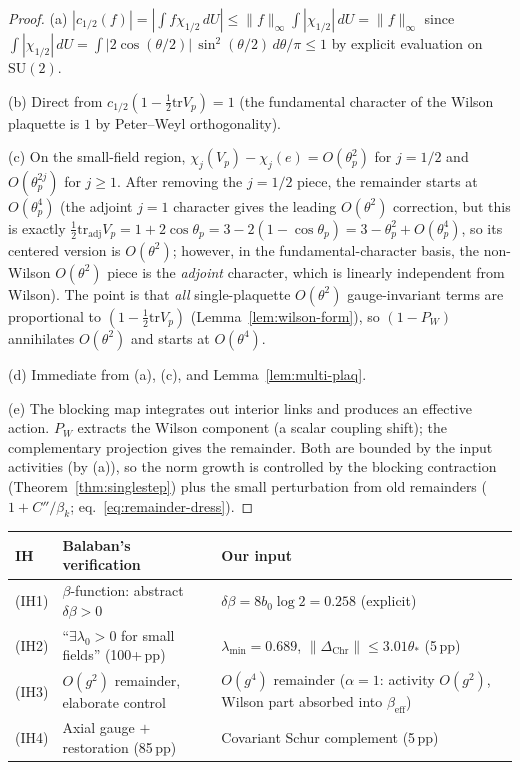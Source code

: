 \documentclass[11pt]{article}
\theoremstyle{definition}
\newcommand{\SU}{\mathrm{SU}}
\newcommand{\tr}{\mathrm{tr}}
\begin{document}
\begin{proof}
(a) $|c_{1/2}(f)|=|\int f\chi_{1/2}\,dU|\le\|f\|_\infty
\int|\chi_{1/2}|\,dU=\|f\|_\infty$ since
$\int|\chi_{1/2}|\,dU=\int|2\cos(\theta/2)|\,\sin^2(\theta/2)
\,d\theta/\pi\le 1$ by explicit evaluation on $\SU(2)$.

(b) Direct from $c_{1/2}(1-\frac{1}{2}\tr V_p)=1$
(the fundamental character of the Wilson plaquette is $1$ by
Peter--Weyl orthogonality).

(c) On the small-field region, $\chi_j(V_p)-\chi_j(e)
=O(\theta_p^2)$ for $j=1/2$ and $O(\theta_p^{2j})$ for $j\ge 1$.
After removing the $j=1/2$ piece, the remainder starts at
$O(\theta_p^4)$ (the adjoint $j=1$ character gives the
leading $O(\theta^2)$ correction, but this is exactly
$\frac{1}{2}\tr_{\mathrm{adj}}V_p=
1+2\cos\theta_p=3-2(1-\cos\theta_p)=3-\theta_p^2+O(\theta_p^4)$,
so its centered version is $O(\theta^2)$; however, in the
fundamental-character basis, the non-Wilson $O(\theta^2)$
piece is the \emph{adjoint} character, which is linearly
independent from Wilson).  The point is that \emph{all}
single-plaquette $O(\theta^2)$ gauge-invariant terms are
proportional to $(1-\frac{1}{2}\tr V_p)$
(Lemma~\ref{lem:wilson-form}), so $(1-P_W)$ annihilates
$O(\theta^2)$ and starts at $O(\theta^4)$.

(d) Immediate from (a), (c), and Lemma~\ref{lem:multi-plaq}.

(e) The blocking map integrates out interior links and produces
an effective action.  $P_W$ extracts the Wilson component (a
scalar coupling shift); the complementary projection gives the
remainder.  Both are bounded by the input activities
(by (a)), so the norm growth is controlled by the blocking
contraction (Theorem~\ref{thm:singlestep}) plus the small
perturbation from old remainders ($1+C''/\beta_k$;
eq.~\eqref{eq:remainder-dress}).
\end{proof}

\begin{center}
\begin{tabular}{lp{5cm}p{5cm}}
\toprule
\textbf{IH} & \textbf{Balaban's verification} & \textbf{Our input}\\
\midrule
(IH1) & $\beta$-function: abstract $\delta\beta>0$ &
$\delta\beta=8b_0\log 2=0.258$ (explicit)\\
(IH2) & ``$\exists\lambda_0>0$ for small fields'' (100+\,pp) &
$\lambda_{\min}=0.689$, $\|\Delta_{\mathrm{Chr}}\|\le 3.01\theta_*$ (5\,pp)\\
(IH3) & $O(g^2)$ remainder, elaborate control &
$O(g^4)$ remainder ($\alpha=1$: activity $O(g^2)$, Wilson part absorbed into $\beta_{\mathrm{eff}}$)\\
(IH4) & Axial gauge $+$ restoration (85\,pp) &
Covariant Schur complement (5\,pp)\\
\bottomrule
\end{tabular}
\end{center}
\end{document}
